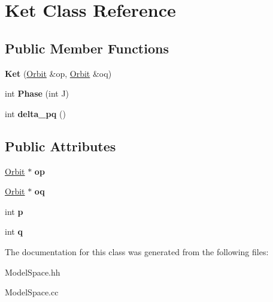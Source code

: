 \hypertarget{classKet}{\section{Ket Class Reference}
\label{classKet}
}
\subsection*{Public Member Functions}
\begin{DoxyCompactItemize}
\item 
\hypertarget{classKet_acbf992b0310758f890a6a0ae659c1a46}{{\bfseries Ket} (\hyperlink{classOrbit}{Orbit} \&op, \hyperlink{classOrbit}{Orbit} \&oq)}\label{classKet_acbf992b0310758f890a6a0ae659c1a46}

\item 
\hypertarget{classKet_ac07bfbc7c7f2bdf77341ba6d54036e8e}{int {\bfseries Phase} (int J)}\label{classKet_ac07bfbc7c7f2bdf77341ba6d54036e8e}

\item 
\hypertarget{classKet_ac91fa789aa9e8043da735332b9db3e58}{int {\bfseries delta\-\_\-pq} ()}\label{classKet_ac91fa789aa9e8043da735332b9db3e58}

\end{DoxyCompactItemize}
\subsection*{Public Attributes}
\begin{DoxyCompactItemize}
\item 
\hypertarget{classKet_a9210bf82629ea07996f3b895bc54ba4d}{\hyperlink{classOrbit}{Orbit} $\ast$ {\bfseries op}}\label{classKet_a9210bf82629ea07996f3b895bc54ba4d}

\item 
\hypertarget{classKet_aa509bf4e812f84bb4c81b00a10d9e82f}{\hyperlink{classOrbit}{Orbit} $\ast$ {\bfseries oq}}\label{classKet_aa509bf4e812f84bb4c81b00a10d9e82f}

\item 
\hypertarget{classKet_a3120fbd6d28583a0e06d6426e0e69c83}{int {\bfseries p}}\label{classKet_a3120fbd6d28583a0e06d6426e0e69c83}

\item 
\hypertarget{classKet_afd050bca27dacccd2637266804b4d710}{int {\bfseries q}}\label{classKet_afd050bca27dacccd2637266804b4d710}

\end{DoxyCompactItemize}


The documentation for this class was generated from the following files\-:\begin{DoxyCompactItemize}
\item 
Model\-Space.\-hh\item 
Model\-Space.\-cc\end{DoxyCompactItemize}
